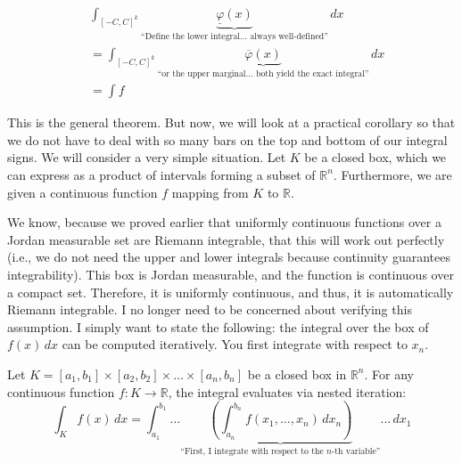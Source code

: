 \begin{math-stroke}
    
\begin{equation}
    \begin{aligned}
        &\int_{[-C,C]^k} \underbrace{\underline{\varphi}(x)}_{\text{``Define the lower integral... always well-defined''}} \, dx \\
        &= \int_{[-C,C]^k} \underbrace{\overline{\varphi}(x)}_{\text{``or the upper marginal... both yield the exact integral''}} \, dx \\
        &= \int f    
    \end{aligned}
\end{equation}
\end{math-stroke}

\begin{spoken-clean}[00:06:07 - 00:08:02]
This is the general theorem. But now, we will look at a practical corollary so that we do not have to deal with so many bars on the top and bottom of our integral signs. We will consider a very simple situation. Let $K$ be a closed box, which we can express as a product of intervals forming a subset of $\mathbb{R}^n$. Furthermore, we are given a continuous function $f$ mapping from $K$ to $\mathbb{R}$. 

We know, because we proved earlier that uniformly continuous functions over a Jordan measurable set are Riemann integrable, that this will work out perfectly (i.e., we do not need the upper and lower integrals because continuity guarantees integrability). This box is Jordan measurable, and the function is continuous over a compact set. Therefore, it is uniformly continuous, and thus, it is automatically Riemann integrable. I no longer need to be concerned about verifying this assumption. I simply want to state the following: the integral over the box of $f(x) \, dx$ can be computed iteratively. You first integrate with respect to $x_n$.
\end{spoken-clean}

\begin{orange-formula}
\begin{corollary}
Let $K = [a_1, b_1] \times [a_2, b_2] \times \dots \times [a_n, b_n]$ be a closed box in $\mathbb{R}^n$. For any continuous function $f: K \to \mathbb{R}$, the integral evaluates via nested iteration:
\[
\int_K f(x) \, dx = \int_{a_1}^{b_1} \dots \underbrace{ \left( \int_{a_n}^{b_n} f(x_1, \dots, x_n) \, dx_n \right) }_{\text{``First, I integrate with respect to the } n\text{-th variable''}} \dots \, dx_1
\]
\end{corollary}
\end{orange-formula}

